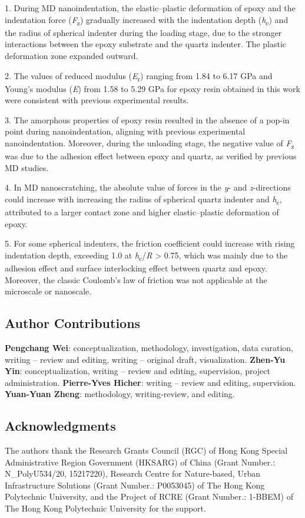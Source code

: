 \documentclass{article}
\begin{document}
\begin{hangpars}
1. During MD nanoindentation, the elastic–plastic deformation of epoxy and the indentation force (\emph{F}\textsubscript{z}) gradually increased with the indentation depth (\emph{h}\textsubscript{c}) and the radius of spherical indenter during the loading stage, due to the stronger interactions between the epoxy substrate and the quartz indenter. The plastic deformation zone expanded outward.

2. The values of reduced modulus (\emph{E}\textsubscript{r}) ranging from 1.84 to 6.17 GPa and Young’s modulus (\emph{E}) from 1.58 to 5.29 GPa for epoxy resin obtained in this work were consistent with previous experimental results.

3. The amorphous properties of epoxy resin resulted in the absence of a pop-in point during nanoindentation, aligning with previous experimental nanoindentation. Moreover, during the unloading stage, the negative value of \emph{F}\textsubscript{z} was due to the adhesion effect between epoxy and quartz, as verified by previous MD studies.

4. In MD nanoscratching, the absolute value of forces in the \emph{y}- and \emph{z}-directions could increase with increasing the radius of spherical quartz indenter and \emph{h}\textsubscript{c}, attributed to a larger contact zone and higher elastic–plastic deformation of epoxy.

5. For some spherical indenters, the friction coefficient could increase with rising indentation depth, exceeding 1.0 at \emph{h}\textsubscript{c}/\emph{R} > 0.75, which was mainly due to the adhesion effect and surface interlocking effect between quartz and epoxy. Moreover, the classic Coulomb’s law of friction was not applicable at the microscale or nanoscale.
\end{hangpars}

\subsection*{Author Contributions}
\textbf{Pengchang Wei}: conceptualization, methodology, investigation, data curation, writing – review and editing, writing – original draft, visualization. \textbf{Zhen-Yu Yin}: conceptualization, writing – review and editing, supervision, project administration. \textbf{Pierre-Yves Hicher}: writing – review and editing, supervision. \textbf{Yuan-Yuan Zheng}: methodology, writing-review, and editing.

\subsection*{Acknowledgments}
The authors thank the Research Grants Council (RGC) of Hong Kong Special Administrative Region Government (HKSARG) of China (Grant Number.: N\_PolyU534/20, 15217220), Research Centre for Nature-based, Urban Infrastructure Solutions (Grant Number.: P0053045) of The Hong Kong Polytechnic University, and the Project of RCRE (Grant Number.: 1-BBEM) of The Hong Kong Polytechnic University for the support.
\end{document}
